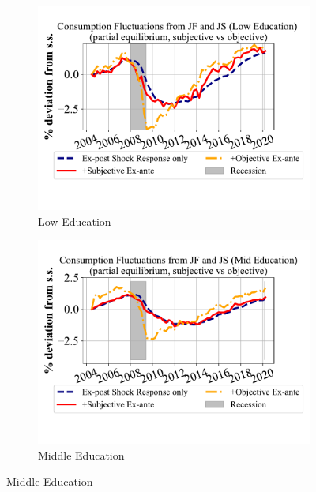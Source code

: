   \begin{figure}[ht]
    \centering
    \caption{\textbf{Quarterly} Consumption Fluctuations due to Unemployment Risks: by Education}
    \label{fig:pe_decompose_sub_obj_educ_monthly}

    \begin{subfigure}{0.32\linewidth}
     \caption*{Low Education}
        \includegraphics[width=\linewidth]{text/chapter2/Figures/consumption_pe_JS_JF_deviation_machine_as_rational_LowEdu.pdf}
    \end{subfigure}
    \hfill
    \begin{subfigure}{0.32\linewidth}
     \caption*{Middle Education}
        \includegraphics[width=\linewidth]{text/chapter2/Figures/consumption_pe_JS_JF_deviation_machine_as_rational_MidEdu.pdf}
       

\end{subfigure}
\end{figure}
